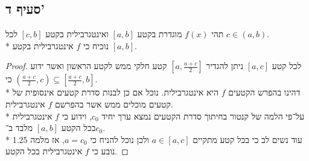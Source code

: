 \subsection{סעיף ד'}
תהי $f(x)$ מוגדרת בקטע $[a, b]$ ואינטגרבילית בקטע $[c, b]$ לכל $c \in (a, b)$. \\*
נוכיח כי $f$ אינטגרבילית בקטע $[a, b]$.
\begin{proof}
	לכל קטע $[a, c]$ ניתן להגדיר $[a, \frac{a + c}{2}]$ קטע חלקי ממש לקטע הראשון ואשר ידוע כי $(\frac{a + c}{2}, c) \subseteq [\frac{a + c}{2}, b]$. \\*
	דהינו בהפרש הקטעים $f$ היא אינטגרבילית. נוכל אם כן לבנות סדרת קטעים אינסופית של קטעים מוכלים ממש אשר בהפרשם $f$ אינטגרבילית. \\*
	על־פי הלמה של קנטור בחיתוך סדרת הקטעים נמצא ערך יחיד $c_0$, וידוע כי $f$ אינטגרבילית בכל הקטע $[a, b]$ מלבד ב־$c_0$. \\*
	עוד נשים לב כי בכל קטע מתקיים $a \in [a, c]$ ולכן נוכל להניח כי $a = c_0$, אז מלמה 1.25 נובע כי $f$ אינטגרבילית בכל הקטע.
\end{proof}

